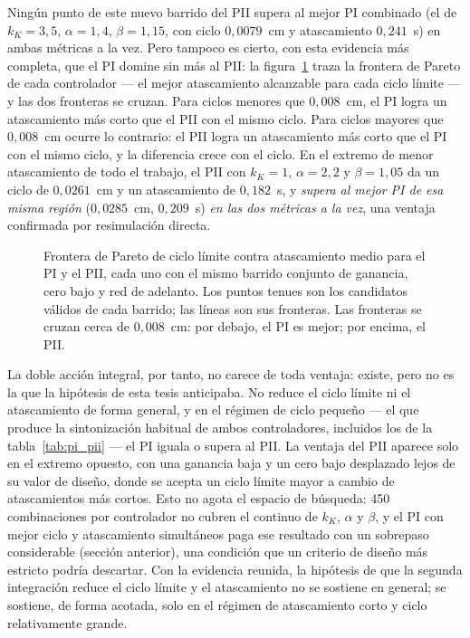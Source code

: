 Ningún punto de este nuevo barrido del PII supera al mejor PI combinado (el de~$k_K=3{,}5$, $\alpha=1{,}4$, $\beta=1{,}15$, con ciclo $0{,}0079$~cm y atascamiento $0{,}241$~s) en ambas métricas a la vez. Pero tampoco es cierto, con esta evidencia más completa, que el PI domine sin más al PII: la figura~\ref{fig:fronteras} traza la frontera de Pareto de cada controlador --- el mejor atascamiento alcanzable para cada ciclo límite --- y las dos fronteras se cruzan. Para ciclos menores que $0{,}008$~cm, el PI logra un atascamiento más corto que el PII con el mismo ciclo. Para ciclos mayores que $0{,}008$~cm ocurre lo contrario: el PII logra un atascamiento más corto que el PI con el mismo ciclo, y la diferencia crece con el ciclo. En el extremo de menor atascamiento de todo el trabajo, el PII con $k_K=1$, $\alpha=2{,}2$ y $\beta=1{,}05$ da un ciclo de $0{,}0261$~cm y un atascamiento de $0{,}182$~s, y \emph{supera al mejor PI de esa misma región} ($0{,}0285$~cm, $0{,}209$~s) \emph{en las dos métricas a la vez}, una ventaja confirmada por resimulación directa.

\begin{figure}[ht]
    \centering
    
    \caption[Fronteras de Pareto, PI contra PII]{Frontera de Pareto de ciclo límite contra atascamiento medio para el PI y el PII, cada uno con el mismo barrido conjunto de ganancia, cero bajo y red de adelanto. Los puntos tenues son los candidatos válidos de cada barrido; las líneas son sus fronteras. Las fronteras se cruzan cerca de $0{,}008$~cm: por debajo, el PI es mejor; por encima, el PII.}
    \label{fig:fronteras}
\end{figure}

La doble acción integral, por tanto, no carece de toda ventaja: existe, pero no es la que la hipótesis de esta tesis anticipaba. No reduce el ciclo límite ni el atascamiento de forma general, y en el régimen de ciclo pequeño --- el que produce la sintonización habitual de ambos controladores, incluidos los de la tabla~\ref{tab:pi_pii} --- el PI iguala o supera al PII. La ventaja del PII aparece solo en el extremo opuesto, con una ganancia baja y un cero bajo desplazado lejos de su valor de diseño, donde se acepta un ciclo límite mayor a cambio de atascamientos más cortos. Esto no agota el espacio de búsqueda: 450 combinaciones por controlador no cubren el continuo de $k_K$, $\alpha$ y $\beta$, y el PI con mejor ciclo y atascamiento simultáneos paga ese resultado con un sobrepaso considerable (sección anterior), una condición que un criterio de diseño más estricto podría descartar. Con la evidencia reunida, la hipótesis de que la segunda integración reduce el ciclo límite y el atascamiento no se sostiene en general; se sostiene, de forma acotada, solo en el régimen de atascamiento corto y ciclo relativamente grande.

